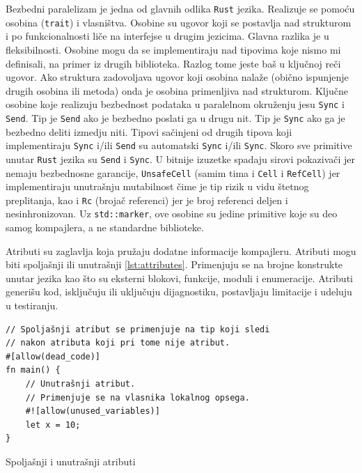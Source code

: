 Bezbedni paralelizam je jedna od glavnih odlika \verb|Rust| jezika. Realizuje se pomoću osobina (\verb|trait|)
i vlasništva. Osobine su ugovor koji se postavlja nad strukturom i po funkcionalnosti liče na interfejse
u drugim jezicima. Glavna razlika je u fleksibilnosti. Osobine mogu da se implementiraju nad tipovima
koje nismo mi definisali, na primer iz drugih biblioteka. Razlog tome jeste baš u ključnoj reči ugovor.
Ako struktura zadovoljava ugovor koji osobina nalaže (obično ispunjenje drugih osobina ili
metoda) onda je osobina primenljiva nad strukturom. Ključne osobine koje realizuju bezbednost podataka
u paralelnom okruženju jesu \verb|Sync| i \verb|Send|. Tip je \verb|Send| ako je bezbedno poslati ga 
u drugu nit. Tip je \verb|Sync| ako ga je bezbedno deliti izmedju niti. Tipovi sačinjeni od drugih tipova koji
implementiraju \verb|Sync| i/ili \verb|Send| su automatski \verb|Sync| i/ili \verb|Sync|. Skoro sve primitive
unutar \verb|Rust| jezika su \verb|Send| i \verb|Sync|. U bitnije izuzetke spadaju sirovi pokazivači jer nemaju
bezbednosne garancije, \verb|UnsafeCell| (samim tima i \verb|Cell| i \verb|RefCell|) jer implementiraju
unutrašnju mutabilnost čime je tip rizik u vidu štetnog preplitanja, kao i \verb|Rc| (brojač referenci) 
jer je broj referenci deljen i nesinhronizovan. Uz \verb|std::marker|, ove osobine su jedine primitive koje su 
deo samog kompajlera, a ne standardne biblioteke.

Atributi su zaglavlja koja pružaju dodatne informacije kompajleru. Atributi mogu biti spoljašnji ili 
unutrašnji \ref{lst:attributes}. Primenjuju se na brojne konstrukte unutar jezika kao što su eksterni blokovi,
funkcije, moduli i enumeracije. Atributi generišu kod, isključuju ili uključuju dijagnostiku, 
postavljaju limitacije i udeluju u testiranju. 

\begin{listing}[H]
\begin{verbatim}
// Spoljašnji atribut se primenjuje na tip koji sledi 
// nakon atributa koji pri tome nije atribut.
#[allow(dead_code)] 
fn main() {
    // Unutrašnji atribut.
    // Primenjuje se na vlasnika lokalnog opsega. 
    #![allow(unused_variables)]
    let x = 10;  
}
\end{verbatim}
\caption{Spoljašnji i unutrašnji atributi}
\label{lst:attributes}
\end{listing}

